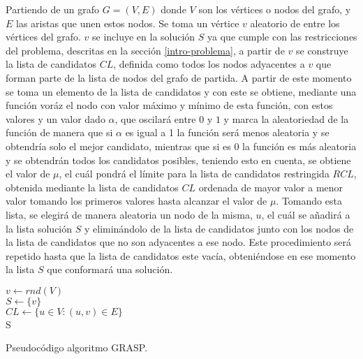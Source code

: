 Partiendo de un grafo $G=(V, E)$ donde $V$ son los vértices o nodos del grafo, y $E$ las aristas que unen estos nodos. Se toma un vértice $v$ aleatorio de entre los vértices del grafo. $v$ se incluye en la solución $S$ ya que cumple con las restricciones del problema, descritas en la sección \ref{intro-problema}, a partir de $v$ se construye la lista de candidatos $CL$, definida como todos los nodos adyacentes a $v$ que forman parte de la lista de nodos del grafo de partida. A partir de este momento se toma un elemento de la lista de candidatos y con este se obtiene, mediante una función voráz el nodo con valor máximo y mínimo de esta función, con estos valores y un valor dado $\alpha$, que oscilará entre $0$ y $1$ y marca la aleatoriedad de la función de manera que si $\alpha$ es igual a 1 la función será menos aleatoria y se obtendría solo el mejor candidato, mientras que si es 0 la función es más aleatoria y se obtendrán todos los candidatos posibles, teniendo esto en cuenta, se obtiene el valor de $\mu$, el cuál pondrá el límite para la lista de candidatos restringida $RCL$, obtenida mediante la lista de candidatos $CL$ ordenada de mayor valor a menor valor tomando los primeros valores hasta alcanzar el valor de $\mu$. Tomando esta lista, se elegirá de manera aleatoria un nodo de la misma, $u$, el cuál se añadirá a la lista solución $S$ y eliminándolo de la lista de candidatos junto con los nodos de la lista de candidatos que no son adyacentes a ese nodo. Este procedimiento será repetido hasta que la lista de candidatos este vacía, obteniéndose en ese momento la lista $S$ que conformará una solución.

\begin{algorithm}
	\SetAlgoLined
	$ v \gets rnd( V ) $ \\[0.2cm]
	$ S \gets \{ v \} $ \\[0.2cm]
	$ CL \gets \{u \in V : (u, v) \in E\} $ \\[0.2cm]
	\Return S
	\caption{Pseudocódigo algoritmo GRASP.}
	\label{alg:grasp}
\end{algorithm}

